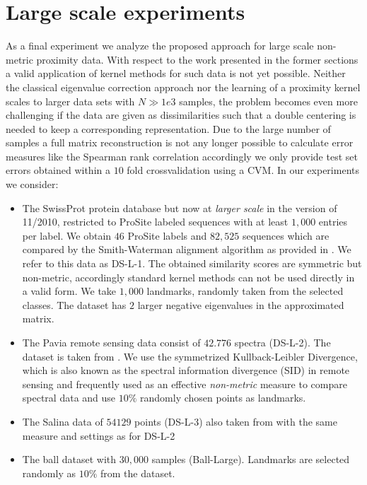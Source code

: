\documentclass[twoside,11pt]{article}
\begin{document}
\section{Large scale experiments}
As a final experiment we analyze the proposed approach for large scale non-metric proximity data. With respect
to the work presented in the former sections a valid application of kernel methods for such data is not yet possible.
Neither the classical eigenvalue correction approach  \cite{DBLP:journals/jmlr/ChenGGRC09} nor the learning
of a proximity kernel \cite{DBLP:conf/icml/ChenGR09} scales to larger data sets with $N \gg 1e3$ samples,
the problem becomes even more challenging if the data are given as dissimilarities such that a double
centering is needed to keep a corresponding representation. Due to the large number of samples a full matrix
reconstruction is not any longer possible to calculate error measures like the Spearman rank correlation accordingly
we only provide test set errors obtained within a $10$ fold crossvalidation using a CVM.
In our experiments we consider:
\begin{itemize}
	\item The SwissProt protein database \cite{swissprot} but now at \emph{larger scale} in the version of 11/2010,
restricted to ProSite labeled sequences with at least $1,000$ entries per label. We obtain 
$46$ ProSite labels and $82,525$ sequences which are compared by the Smith-Waterman alignment
algorithm as provided in \cite{citeulike:668527}. We refer to this data as DS-L-1. The obtained similarity scores 
are symmetric but non-metric,  accordingly standard kernel methods can not be used directly in a valid form.
We take $1,000$ landmarks, randomly taken from the selected classes. 
The dataset has $2$ larger negative eigenvalues in the approximated matrix.
\item The Pavia remote sensing data consist of $42.776$ spectra (DS-L-2). The dataset is taken from \cite{RemoteSensing}. 
	We use the symmetrized Kullback-Leibler Divergence, which is also known as the 
	spectral information divergence (SID) in remote sensing and frequently used as an effective \emph{non-metric} 
	measure to compare spectral data \cite{vanderMeer20063} and use $10\%$ randomly chosen points as landmarks.

	\item The Salina data of $54129 $ points (DS-L-3) also taken from \cite{RemoteSensing} with the same measure
	and settings as for DS-L-2
	\item The ball dataset with $30,000$ samples (Ball-Large). Landmarks are selected randomly as $10\%$ from the dataset.
\end{itemize}
\end{document}
